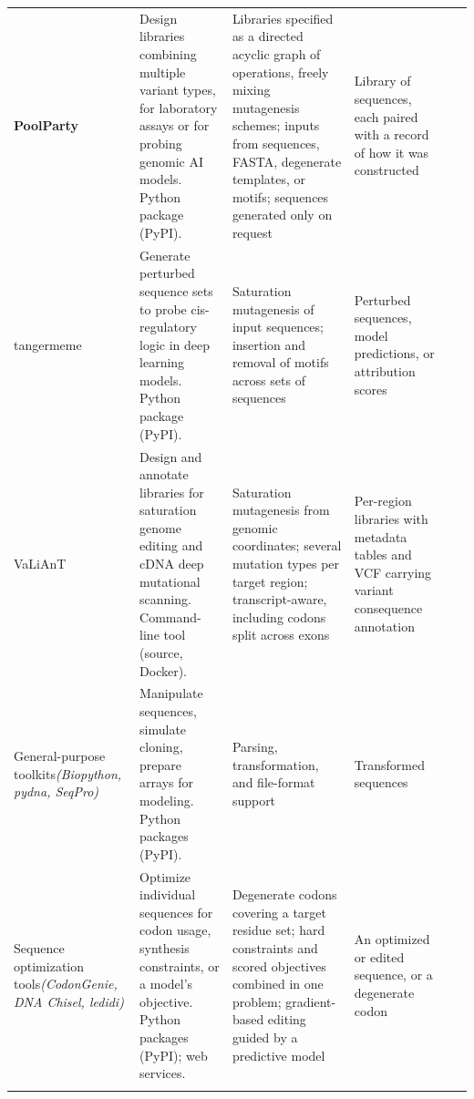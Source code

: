 \begin{table}
\begin{tabular}{@{}>{\raggedright\arraybackslash}p{2.0cm}>{\raggedright\arraybackslash}p{3.4cm}>{\raggedright\arraybackslash}p{5.45cm}>{\raggedright\arraybackslash}p{3.6cm}>{\raggedright\arraybackslash}p{2.7cm}l@{}}
\textbf{PoolParty} &
Design libraries combining multiple variant types, for laboratory assays
or for probing genomic AI models. Python package (PyPI). &
Libraries specified as a directed acyclic graph of operations, freely
mixing mutagenesis schemes; inputs from sequences, FASTA, degenerate
templates, or motifs; sequences generated only on request &
Library of sequences, each paired with a record of how it was constructed\\
\addlinespace

tangermeme \citep{Schreiber2025nd} &
Generate perturbed sequence sets to probe cis-regulatory logic in deep
learning models. Python package (PyPI). &
Saturation mutagenesis of input sequences; insertion and removal of motifs
across sets of sequences &
Perturbed sequences, model predictions, or attribution scores\\
\addlinespace

VaLiAnT \citep{Barbon2022th} &
Design and annotate libraries for saturation genome editing and cDNA deep
mutational scanning. Command-line tool (source, Docker). &
Saturation mutagenesis from genomic coordinates; several mutation types
per target region; transcript-aware, including codons split across exons &
Per-region libraries with metadata tables and VCF carrying variant
consequence annotation\\
\midrule

General-purpose toolkits\newline\textit{(Biopython, pydna, SeqPro)} \citep{Cock2009df,Pereira2015wj,Klie2023kg} &
Manipulate sequences, simulate cloning, prepare arrays for modeling.
Python packages (PyPI). &
Parsing, transformation, and file-format support &
Transformed sequences\\
\addlinespace

Sequence optimization tools\newline\textit{(CodonGenie, DNA Chisel, ledidi)} \citep{Swainston2017rb,Zulkower2020jk,Schreiber2025ledidi} &
Optimize individual sequences for codon usage, synthesis constraints, or a
model's objective. Python packages (PyPI); web services. &
Degenerate codons covering a target residue set; hard constraints and
scored objectives combined in one problem; gradient-based editing guided
by a predictive model &
An optimized or edited sequence, or a degenerate codon\\
\botrule
\end{tabular}
\end{table}
